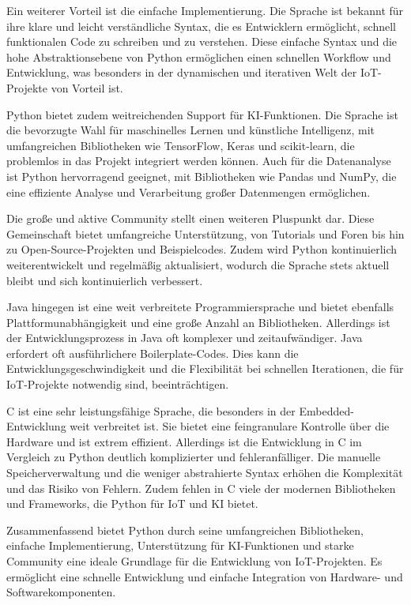 Ein weiterer Vorteil ist die einfache Implementierung. Die Sprache ist bekannt für ihre klare und leicht verständliche Syntax, die es Entwicklern ermöglicht, schnell funktionalen Code zu schreiben und zu verstehen. Diese einfache Syntax und die hohe Abstraktionsebene von Python ermöglichen einen schnellen Workflow und Entwicklung, was besonders in der dynamischen und iterativen Welt der IoT-Projekte von Vorteil ist.

Python bietet zudem weitreichenden Support für KI-Funktionen. Die Sprache ist die bevorzugte Wahl für maschinelles Lernen und künstliche Intelligenz, mit umfangreichen Bibliotheken wie TensorFlow, Keras und scikit-learn, die problemlos in das Projekt integriert werden können. Auch für die Datenanalyse ist Python hervorragend geeignet, mit Bibliotheken wie Pandas und NumPy, die eine effiziente Analyse und Verarbeitung großer Datenmengen ermöglichen.

Die große und aktive Community stellt einen weiteren Pluspunkt dar. Diese Gemeinschaft bietet umfangreiche Unterstützung, von Tutorials und Foren bis hin zu Open-Source-Projekten und Beispielcodes. Zudem wird Python kontinuierlich weiterentwickelt und regelmäßig aktualisiert, wodurch die Sprache stets aktuell bleibt und sich kontinuierlich verbessert.

Java hingegen ist eine weit verbreitete Programmiersprache und bietet ebenfalls Plattformunabhängigkeit und eine große Anzahl an Bibliotheken. Allerdings ist der Entwicklungsprozess in Java oft komplexer und zeitaufwändiger. Java erfordert oft ausführlichere Boilerplate-Codes. Dies kann die Entwicklungsgeschwindigkeit und die Flexibilität bei schnellen Iterationen, die für IoT-Projekte notwendig sind, beeinträchtigen.

C ist eine sehr leistungsfähige Sprache, die besonders in der Embedded-Entwicklung weit verbreitet ist. Sie bietet eine feingranulare Kontrolle über die Hardware und ist extrem effizient. Allerdings ist die Entwicklung in C im Vergleich zu Python deutlich komplizierter und fehleranfälliger. Die manuelle Speicherverwaltung und die weniger abstrahierte Syntax erhöhen die Komplexität und das Risiko von Fehlern. Zudem fehlen in C viele der modernen Bibliotheken und Frameworks, die Python für IoT und KI bietet.

Zusammenfassend bietet Python durch seine umfangreichen Bibliotheken, einfache Implementierung, Unterstützung für KI-Funktionen und starke Community eine ideale Grundlage für die Entwicklung von IoT-Projekten. Es ermöglicht eine schnelle Entwicklung und einfache Integration von Hardware- und Softwarekomponenten.

